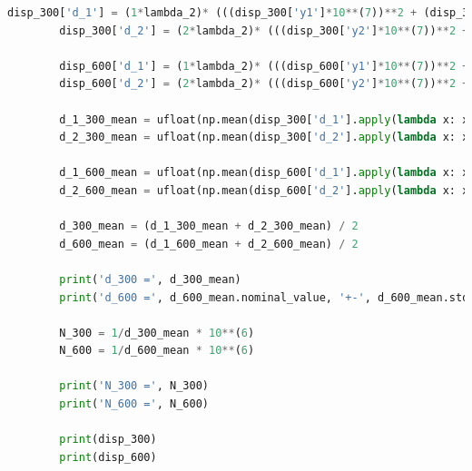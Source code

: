 \documentclass[a4paper,11pt]{article}
\begin{document}
\begin{lstlisting}[language=Python, basicstyle=\tiny, breaklines=true, postbreak=\mbox{\textbackslashspace}]
        disp_300['d_1'] = (1*lambda_2)* (((disp_300['y1']*10**(7))**2 + (disp_300['x']*10**(7))**2)**(1/2))/(disp_300['y1']*10**(7))
        disp_300['d_2'] = (2*lambda_2)* (((disp_300['y2']*10**(7))**2 + (disp_300['x']*10**(7))**2)**(1/2))/(disp_300['y2']*10**(7))

        disp_600['d_1'] = (1*lambda_2)* (((disp_600['y1']*10**(7))**2 + (disp_600['x']*10**(7))**2)**(1/2))/(disp_600['y1']*10**(7))
        disp_600['d_2'] = (2*lambda_2)* (((disp_600['y2']*10**(7))**2 + (disp_600['x']*10**(7))**2)**(1/2))/(disp_600['y2']*10**(7))

        d_1_300_mean = ufloat(np.mean(disp_300['d_1'].apply(lambda x: x.nominal_value)), np.sqrt(np.std(disp_300['d_1'].apply(lambda x: x.nominal_value))**2 + np.mean(disp_300['d_1'].apply(lambda x: x.std_dev)**2)))
        d_2_300_mean = ufloat(np.mean(disp_300['d_2'].apply(lambda x: x.nominal_value)), np.sqrt(np.std(disp_300['d_2'].apply(lambda x: x.nominal_value))**2 + np.mean(disp_300['d_2'].apply(lambda x: x.std_dev)**2)))

        d_1_600_mean = ufloat(np.mean(disp_600['d_1'].apply(lambda x: x.nominal_value)), np.sqrt(np.std(disp_600['d_1'].apply(lambda x: x.nominal_value))**2 + np.mean(disp_600['d_1'].apply(lambda x: x.std_dev)**2)))
        d_2_600_mean = ufloat(np.mean(disp_600['d_2'].apply(lambda x: x.nominal_value)), np.sqrt(np.std(disp_600['d_2'].apply(lambda x: x.nominal_value))**2 + np.mean(disp_600['d_2'].apply(lambda x: x.std_dev)**2)))

        d_300_mean = (d_1_300_mean + d_2_300_mean) / 2
        d_600_mean = (d_1_600_mean + d_2_600_mean) / 2

        print('d_300 =', d_300_mean)
        print('d_600 =', d_600_mean.nominal_value, '+-', d_600_mean.std_dev)

        N_300 = 1/d_300_mean * 10**(6)
        N_600 = 1/d_600_mean * 10**(6)

        print('N_300 =', N_300)
        print('N_600 =', N_600)

        print(disp_300)
        print(disp_600)
    \end{lstlisting}
\end{document}
